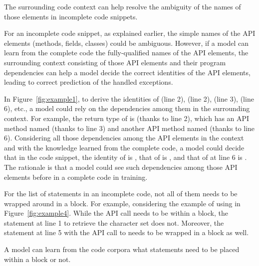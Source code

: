 \begin{Observation} 
\label{ob4}
The surrounding code context can help resolve the ambiguity of the
names of those elements in incomplete code snippets.
\end{Observation}

For an incomplete code snippet, as explained earlier, the simple names
of the API elements (methods, fields, classes) could be ambiguous.
However, if a model can learn from the complete code the
fully-qualified names of the API elements, the surrounding
context consisting of those API elements and their program
dependencies can help a model decide the correct identities of
the API elements, leading to correct prediction of the handled
exceptions.



In Figure~\ref{fig:example1}, to derive the identities of
 (line 2),  (line 2),
 (line 3),  (line 6), etc., a model
could rely on the dependencies among them in the surrounding context.
For example, the return type of  is
 (thanks to line 2), which has an API method named
 (thanks to line 3) and another API method named
 (thanks to line 6). Considering all those dependencies among
the API elements in the context and with the knowledge learned from
the complete code, a model could decide that in the code snippet, the identity of
 is , that of
 is
, and that of 
 at line 6 is
. The rationale is that a
model could see such dependencies among those API elements before in
a complete code in training.





For the list of statements in an incomplete code, not all of them
needs to be wrapped around in a  block. For example,
considering the example of using  in
Figure~\ref{fig:example4}. While the API call
 needs to be within a
 block, the statement at line 1 to retrieve the
character set does not. Moreover, the statement at line 5 with the API
call to  needs to be wrapped in a 
block as well.






\begin{Observation} 
\label{ob5}
  A model can learn from the code corpora what statements need to be placed
  within a  block or not.
\end{Observation}
